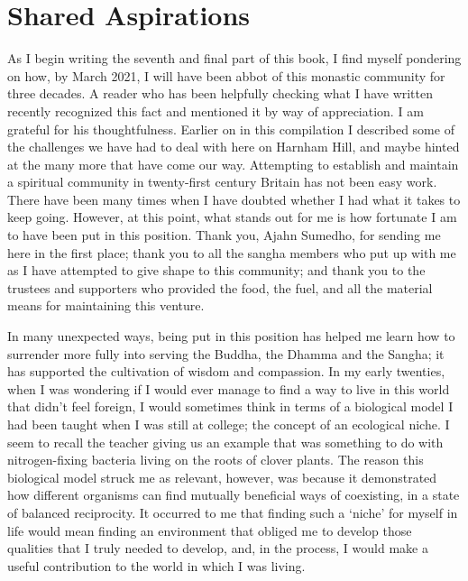 \chapter{Shared Aspirations}

\enlargethispage*{\baselineskip}

As I begin writing the seventh and final part of this book, I find
myself pondering on how, by March 2021, I will have been abbot of this
monastic community for three decades. A reader who has been helpfully
checking what I have written recently recognized this fact and mentioned
it by way of appreciation. I am grateful for his thoughtfulness. Earlier
on in this compilation I described some of the challenges we have had to
deal with here on Harnham Hill, and maybe hinted at the many more that
have come our way. Attempting to establish and maintain a spiritual
community in twenty-first century Britain has not been easy work. There
have been many times when I have doubted whether I had what it takes to
keep going. However, at this point, what stands out for me is how
fortunate I am to have been put in this position. Thank you, Ajahn
Sumedho, for sending me here in the first place; thank you to all the
sangha members who put up with me as I have attempted to give shape to
this community; and thank you to the trustees and supporters who
provided the food, the fuel, and all the material means for maintaining
this venture.

In many unexpected ways, being put in this position has helped me learn
how to surrender more fully into serving the Buddha, the Dhamma and the
Sangha; it has supported the cultivation of wisdom and compassion. In my
early twenties, when I was wondering if I would ever manage to find a
way to live in this world that didn't feel foreign, I would sometimes
think in terms of a biological model I had been taught when I was still
at college; the concept of an ecological niche. I seem to recall the
teacher giving us an example that was something to do with
nitrogen-fixing bacteria living on the roots of clover plants. The
reason this biological model struck me as relevant, however, was because
it demonstrated how different organisms can find mutually beneficial
ways of coexisting, in a state of balanced reciprocity. It occurred to
me that finding such a `niche' for myself in life would mean finding an
environment that obliged me to develop those qualities that I truly
needed to develop, and, in the process, I would make a useful
contribution to the world in which I was living.


